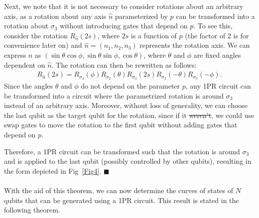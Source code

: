 \documentclass[10pt,letterpaper]{article} %
\newcommand{\fref}[1]{Fig~\ref{#1}}
\providecommand{\DIFaddtex}[1]{{\protect\color{blue}\uwave{#1}}} %
\providecommand{\DIFdeltex}[1]{{\protect\color{red}\sout{#1}}}                      %
\providecommand{\DIFaddbegin}{} %
\providecommand{\DIFaddend}{} %
\providecommand{\DIFdelbegin}{} %
\providecommand{\DIFdelend}{} %
\providecommand{\DIFadd}[1]{\texorpdfstring{\DIFaddtex{#1}}{#1}} %
\providecommand{\DIFdel}[1]{\texorpdfstring{\DIFdeltex{#1}}{}} %
\newcommand{\DIFscaledelfig}{0.5}
\newlength{\DIFdelgraphicswidth} %
\newlength{\DIFdelgraphicsheight} %
\newcommand{\DIFaddincludegraphics}[2][]{{\color{blue}\fbox{\DIFOincludegraphics[#1]{#2}}}} %
\newcommand{\DIFdelincludegraphics}[2][]{%
\sbox{\DIFdelgraphicsbox}{\DIFOincludegraphics[#1]{#2}}%
\settoboxwidth{\DIFdelgraphicswidth}{\DIFdelgraphicsbox} %
\settoboxtotalheight{\DIFdelgraphicsheight}{\DIFdelgraphicsbox} %
\scalebox{\DIFscaledelfig}{%
\parbox[b]{\DIFdelgraphicswidth}{\usebox{\DIFdelgraphicsbox}\\[-\baselineskip] \rule{\DIFdelgraphicswidth}{0em}}\llap{\resizebox{\DIFdelgraphicswidth}{\DIFdelgraphicsheight}{%
\setlength{\unitlength}{\DIFdelgraphicswidth}%
\begin{picture}(1,1)%
\thicklines\linethickness{2pt} %
{\color[rgb]{1,0,0}\put(0,0){\framebox(1,1){}}}%
{\color[rgb]{1,0,0}\put(0,0){\line( 1,1){1}}}%
{\color[rgb]{1,0,0}\put(0,1){\line(1,-1){1}}}%
\end{picture}%
}\hspace*{3pt}}} %
} %
\DeclareRobustCommand{\DIFaddbegin}{\DIFOaddbegin \let\includegraphics\DIFaddincludegraphics} %
\DeclareRobustCommand{\DIFaddend}{\DIFOaddend \let\includegraphics\DIFOincludegraphics} %
\DeclareRobustCommand{\DIFdelbegin}{\DIFOdelbegin \let\includegraphics\DIFdelincludegraphics} %
\DeclareRobustCommand{\DIFdelend}{\DIFOaddend \let\includegraphics\DIFOincludegraphics} %
\begin{document}
Next, we note that it is not necessary to consider rotations about an arbitrary axis,
as a rotation about any axis $\hat{n}$ parameterized by $p$
can be transformed into a rotation about $\sigma_3$ without introducing 
gates that depend on $p$. To see this, consider the rotation $R_{\hat{n}}(2s)$, where $2s$ 
is a function of $p$ (the factor of 2 is for convenience later on) 
and $\hat{n} = (n_1,n_2,n_3)$ represents the rotation axis. 
We can express $\hat{n}$ as $(\sin \theta \cos \phi, \sin \theta \sin \phi, \cos \theta)$, 
where $\theta$ and $\phi$ are fixed angles dependent on $\hat{n}$. 
The rotation can then be rewritten as follows:
\begin{eqnarray}
R_{\hat{n}}(2s) = R_{\sigma_3}(\phi) R_{\sigma_2}(\theta) R_{\sigma_3}(2s) R_{\sigma_2}(-\theta) R_{\sigma_3}(-\phi).
\end{eqnarray}
Since the angles $\theta$ and $\phi$ do not depend on the parameter $p$,
any 1PR circuit can be transformed into a circuit where the parametrized
 rotation is around $\sigma_3$ instead of an arbitrary axis. 
Moreover, without loss of generality, we can choose the last qubit as the
target qubit for the rotation, since if it \DIFdelbegin \DIFdel{weren't}\DIFdelend \DIFaddbegin \DIFadd{is not}\DIFaddend , we could use
swap gates to move the rotation
to the first qubit without adding gates
that depend on $p$. 

Therefore, a 1PR circuit can be transformed such
that the rotation is around $\sigma_3$ and is applied to the last qubit 
(possibly controlled by other qubits), 
resulting in the form depicted in \fref{Fig4}. 
$\blacksquare$ \\
$\;$\\

With the aid of this theorem, we can now determine the curves
of states of $N$ qubits that can be generated using a 1PR circuit. 
This result is stated in the following theorem.
\end{document}
